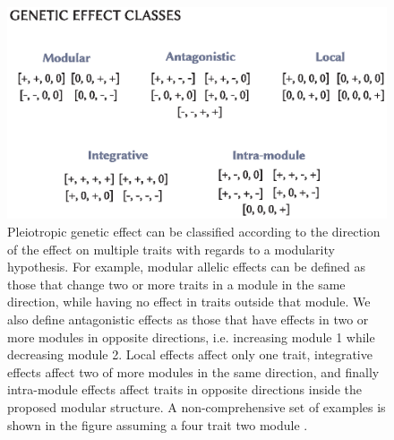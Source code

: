 \begin{refsection}
\begin{figure}
    \centering
    \includegraphics[width=\linewidth]{chapter_atchley/media/genetic_effects.eps}
    \caption[Pleiotropic vector classification]{Pleiotropic genetic effect can be classified according to the direction of the effect on multiple traits with regards to a modularity hypothesis. For example, modular allelic effects can be defined as those that change two or more traits in a module in the same direction, while having no effect in traits outside that module. We also define antagonistic effects as those that have effects in two or more modules in opposite directions, i.e. increasing module 1 while decreasing module 2. Local effects affect only one trait, integrative effects affect two of more modules in the same direction, and finally intra-module effects affect traits in opposite directions inside the proposed modular structure. A non-comprehensive set of examples is shown in the figure assuming a four trait two module .}
    \label{effectclassification}
\end{figure}


\printbibliography

\end{refsection}